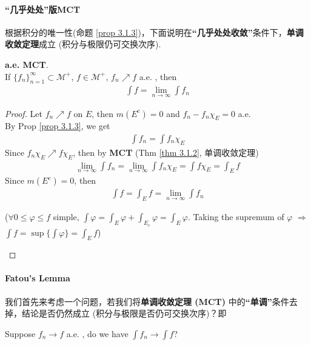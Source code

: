  \newpage
 \paragraph{“几乎处处”版\textbf{MCT}}
 	根据积分的唯一性(命题 \ref{prop 3.1.3})，下面说明在\textbf{“几乎处处收敛”}条件下，\textbf{单调收敛定理}成立 (积分与极限仍可交换次序).
 	\begin{corollary}\label{cor 3.1.5}
 		\textbf{a.e. MCT}.\\
 		If $\{ f_n \}_{n = 1}^{\infty} \subset \mathcal{M}^{+}$, $f \in \mathcal{M^{+}}$, $f_n \nearrow f$ a.e. , then
 		\begin{align}
 			\int{f} = \lim_{n \to \infty}{\int{f_n}}
 		\end{align}
 	
 		\vspace{2em}
 		\begin{proof}
 			Let $f_n \nearrow f$ on $E$, then $m(E^c) = 0$ and $f_{n} - f_{n}\chi_E = 0$ a.e. \\
 			By Prop \ref{prop 3.1.3}, we get
 			\begin{align}
 				\int{f_n} = \int{f_n \chi_E}
 			\end{align}
 			Since $f_n \chi_E \nearrow f \chi_E$, then by \textbf{MCT} (Thm \ref{thm 3.1.2}, 单调收敛定理)
 			\begin{align}
 				\lim_{n \to \infty}{\int{f_n}} = \lim_{n \to \infty}{\int{f_n \chi_E}} = \int{f \chi_E} = \int_{E}{f}
 			\end{align}
 			Since $m(E^c) = 0$, then
 			\begin{align}
 				\int{f} = \int_{E}{f} = \lim_{n \to \infty}{\int{f_n}}
 			\end{align}
 		\begin{center}
 			($\forall 0 \leq \varphi \leq f$ simple, $\int{\varphi} = \int_{E}{\varphi} + \int_{E_c}{\varphi} = \int_{E}{\varphi}$. Taking the supremum of $\varphi$ $\Rightarrow$ $\int{f} = \sup{\{ \int{\varphi} \}} = \int_{E}{f}$)
 		\end{center}
 		\end{proof}
 	\end{corollary}
 
 \vspace{2em}
 \paragraph{Fatou's Lemma}
 	我们首先来考虑一个问题，若我们将\textbf{单调收敛定理 (MCT)} 中的\textbf{“单调”}条件去掉，结论是否仍然成立 (积分与极限是否仍可交换次序)？即
 	\begin{center}
 		Suppose $f_n \to f$ a.e. , do we have $\int{f_n} \to \int{f}$?
 	\end{center}
 
